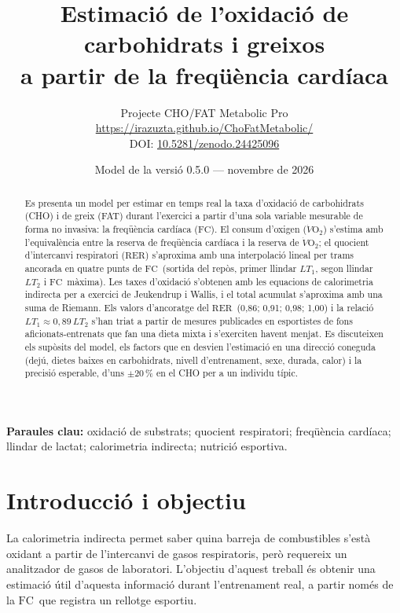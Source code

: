 \documentclass[10pt,a4paper]{article}
\title{\textbf{Estimació de l'oxidació de carbohidrats i greixos\\
a partir de la freqüència cardíaca}}
\author{Projecte CHO/FAT Metabolic Pro\\
\small\url{https://irazuzta.github.io/ChoFatMetabolic/}\\[2pt]
\small DOI: \href{https://doi.org/10.5281/zenodo.24425096}{10.5281/zenodo.24425096}}
\date{Model de la versió 0.5.0 --- novembre de 2026}
\newcommand{\VO}{\ensuremath{\dot V\mathrm{O_2}}}
\newcommand{\RER}{\ensuremath{\mathrm{RER}}}
\newcommand{\FC}{\ensuremath{\mathrm{FC}}}
\begin{document}
\maketitle
{\let\thefootnote\relax{}}

\begin{abstract}
\noindent
Es presenta un model per estimar en temps real la taxa d'oxidació de carbohidrats
(CHO) i de greix (FAT) durant l'exercici a partir d'una sola variable mesurable de
forma no invasiva: la freqüència cardíaca (\FC). El consum d'oxigen (\VO) s'estima
amb l'equivalència entre la reserva de freqüència cardíaca i la reserva de \VO; el
quocient d'intercanvi respiratori (\RER) s'aproxima amb una interpolació lineal per
trams ancorada en quatre punts de \FC\ (sortida del repòs, primer llindar $LT_1$,
segon llindar $LT_2$ i \FC\ màxima). Les taxes d'oxidació s'obtenen amb les
equacions de calorimetria indirecta per a exercici de Jeukendrup i Wallis, i el
total acumulat s'aproxima amb una suma de Riemann. Els valors d'ancoratge del \RER\
(0,86; 0,91; 0,98; 1,00) i la relació $LT_1\approx0{,}89\,LT_2$ s'han triat a partir
de mesures publicades en esportistes de fons aficionats-entrenats que fan una dieta
mixta i s'exerciten havent menjat. Es discuteixen els supòsits del model, els
factors que en desvien l'estimació en una direcció coneguda (dejú, dietes baixes en
carbohidrats, nivell d'entrenament, sexe, durada, calor) i la precisió esperable,
d'uns $\pm20\,\%$ en el CHO per a un individu típic.
\end{abstract}

\noindent\textbf{Paraules clau:} oxidació de substrats; quocient respiratori;
freqüència cardíaca; llindar de lactat; calorimetria indirecta; nutrició esportiva.

\section{Introducció i objectiu}

La calorimetria indirecta permet saber quina barreja de combustibles s'està oxidant
a partir de l'intercanvi de gasos respiratoris, però requereix un analitzador de
gasos de laboratori. L'objectiu d'aquest treball és obtenir una estimació útil
d'aquesta informació durant l'entrenament real, a partir només de la \FC\ que
registra un rellotge esportiu.
\end{document}
